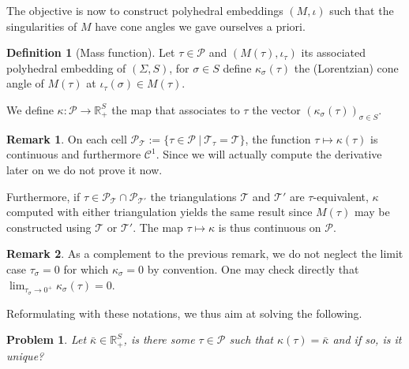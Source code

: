 \documentclass[a4paper,12pt]{article}
\def\TT{\mathcal T}
\def\adm{\P}
\def\RR{\mathbb{R}}
\def\adm{\mathcal{P}}
\def\P{\mathcal{P}}
\def\CellPSigma{\P_\TT}
\newtheorem*{problem}{Problem}
\theoremstyle{definition}
\newtheorem{defi}[lem]{Definition}	%
\newtheorem*{rem}{Remark}			 %
\begin{document}
				The objective is now to construct polyhedral embeddings $(M,\iota)$ such that the singularities of $M$ have cone angles we gave ourselves a priori.
				\begin{defi}[Mass function]

				Let $\tau \in \adm$ and $(M(\tau),\iota_\tau)$ its associated polyhedral embedding of $(\Sigma, S)$, for $\sigma\in S$ define $\kappa_\sigma(\tau)$ the (Lorentzian) cone angle of $M(\tau)$ at $\iota_\tau(\sigma) \in M(\tau)$.

				We define $\kappa: \adm \rightarrow \RR_+^{S}$ the map that associates to $\tau$ the vector $(\kappa_\sigma(\tau))_{\sigma\in S}$.
				\end{defi}
				\begin{rem} On each cell $\CellPSigma:=\{\tau\in \adm ~|~ \TT_\tau=\TT \}$, the function $\tau \mapsto \kappa(\tau)$ is continuous and furthermore $\mathscr C^1$. Since we will actually compute the derivative later on we do not prove it now. 
				
				Furthermore, if $\tau \in \CellPSigma\cap \P_{\TT'}$ the triangulations $\TT$ and $\TT'$ are $\tau$-equivalent, $\kappa$ computed with either triangulation yields the same result since $M(\tau)$ may be constructed using $\TT$ or $\TT'$. The map $\tau\mapsto \kappa$ is thus continuous on $\adm$.
				\end{rem}
				\begin{rem}
				 As a complement to the previous remark, we do not neglect the limit case $\tau_\sigma = 0$ for which $\kappa_\sigma=0$ by convention. One may check directly that $\lim_{\tau_\sigma\rightarrow 0^+} \kappa_\sigma(\tau)=0$.
				\end{rem}

				Reformulating with these notations, we thus aim at solving the following.
				\begin{problem}\label{prob:kappa_bar}
				 Let $\bar\kappa \in \RR_+^{S}$, is there some $\tau\in \adm$ such that $\kappa(\tau)=\bar\kappa$ and if so, is it unique?
				\end{problem}
				
\end{document}
